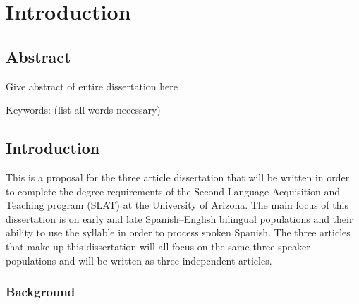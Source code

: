 
\chapter{Introduction} %

\label{Chapter1} %


\section{Abstract}

Give abstract of entire dissertation here

Keywords: (list all words necessary)


\section{Introduction}

This is a proposal for the three article dissertation that will be written in order to complete the degree requirements of the Second Language Acquisition and Teaching program (SLAT) at the University of Arizona. The main focus of this dissertation is on early and late Spanish–English bilingual populations and their ability to use the syllable in order to process spoken Spanish. The three articles that make up this dissertation will all focus on the same three speaker populations and will be written as three independent articles.

\subsection{Background}


